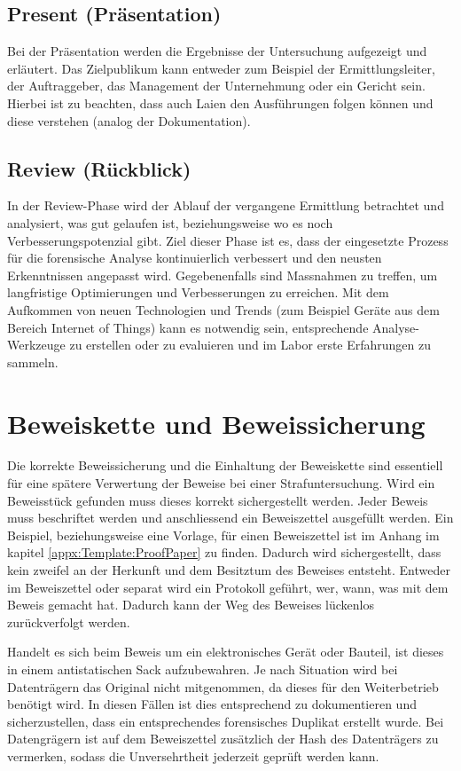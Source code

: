 
\subsection{Present (Präsentation)}
Bei der Präsentation werden die Ergebnisse der Untersuchung aufgezeigt und erläutert. Das Zielpublikum kann entweder zum Beispiel der Ermittlungsleiter, der Auftraggeber, das Management der Unternehmung oder ein Gericht sein. Hierbei ist zu beachten, dass auch Laien den Ausführungen folgen können und diese verstehen (analog der Dokumentation).

\subsection{Review (Rückblick)}
In der Review-Phase wird der Ablauf der vergangene Ermittlung betrachtet und analysiert, was gut gelaufen ist, beziehungsweise wo es noch Verbesserungspotenzial gibt. Ziel dieser Phase ist es, dass der eingesetzte Prozess für die forensische Analyse kontinuierlich verbessert und den neusten Erkenntnissen angepasst wird. Gegebenenfalls sind Massnahmen zu treffen, um langfristige Optimierungen und Verbesserungen zu erreichen. Mit dem Aufkommen von neuen Technologien und Trends (zum Beispiel Geräte aus dem Bereich Internet of Things) kann es notwendig sein, entsprechende Analyse-Werkzeuge zu erstellen oder zu evaluieren und im Labor erste Erfahrungen zu sammeln.

\section{Beweiskette und Beweissicherung}
Die korrekte Beweissicherung und die Einhaltung der Beweiskette sind essentiell für eine spätere Verwertung der Beweise bei einer Strafuntersuchung. Wird ein Beweisstück gefunden muss dieses korrekt sichergestellt werden. Jeder Beweis muss beschriftet werden und anschliessend ein Beweiszettel ausgefüllt werden. Ein Beispiel, beziehungsweise eine Vorlage, für einen Beweiszettel ist im Anhang im kapitel \ref{appx:Template:ProofPaper}  zu finden. Dadurch wird sichergestellt, dass kein zweifel an der Herkunft und dem Besitztum des Beweises entsteht. Entweder im Beweiszettel oder separat wird ein Protokoll geführt, wer, wann, was mit dem Beweis gemacht hat. Dadurch kann der Weg des Beweises lückenlos zurückverfolgt werden.

Handelt es sich beim Beweis um ein elektronisches Gerät oder Bauteil, ist dieses in einem antistatischen Sack aufzubewahren. Je nach Situation wird bei Datenträgern das Original nicht mitgenommen, da dieses für den Weiterbetrieb benötigt wird. In diesen Fällen ist dies entsprechend zu dokumentieren und sicherzustellen, dass ein entsprechendes forensisches Duplikat erstellt wurde. Bei Datengrägern ist auf dem Beweiszettel zusätzlich der Hash des Datenträgers zu vermerken, sodass die Unversehrtheit jederzeit geprüft werden kann.


